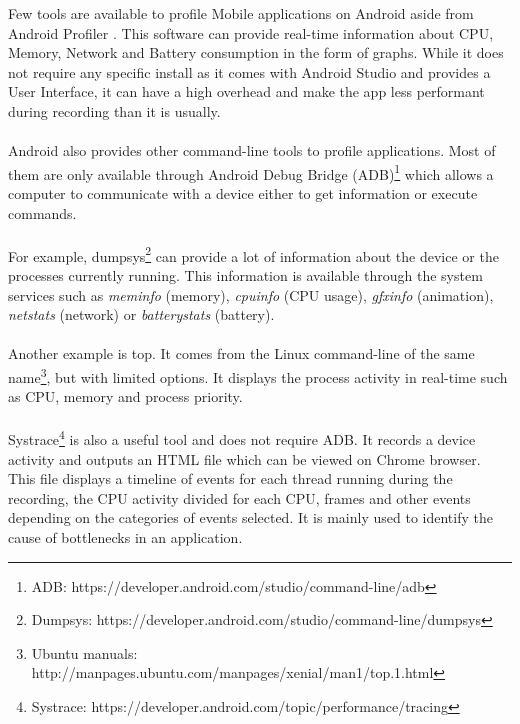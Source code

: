 \documentclass{kththesis}
\begin{document}
Few tools are available to profile Mobile applications on Android aside from Android Profiler \cite{nanoscope}. This software can provide real-time information about CPU, Memory, Network and Battery consumption in the form of graphs. While it does not require any specific install as it comes with Android Studio and provides a User Interface, it can have a high overhead \cite{nanoscope} and make the app less performant during recording than it is usually. 

\paragraph{}
Android also provides other command-line tools to profile applications. Most of them are only available through Android Debug Bridge (ADB)\footnote{ADB: https://developer.android.com/studio/command-line/adb} which allows a computer to communicate with a device either to get information or execute commands. 

\paragraph{}
For example, dumpsys\footnote{Dumpsys: https://developer.android.com/studio/command-line/dumpsys} can provide a lot of information about the device or the processes currently running. This information is available through the system services such as \textit{meminfo} (memory), \textit{cpuinfo} (CPU usage), \textit{gfxinfo} (animation), \textit{netstats} (network) or \textit{batterystats} (battery).

\paragraph{}
Another example is top. It comes from the Linux command-line of the same name\footnote{Ubuntu manuals: http://manpages.ubuntu.com/manpages/xenial/man1/top.1.html}, but with limited options. It displays the process activity in real-time such as CPU, memory and process priority.

\paragraph{}
Systrace\footnote{Systrace: https://developer.android.com/topic/performance/tracing} is also a useful tool and does not require ADB. It records a device activity and outputs an HTML file which can be viewed on Chrome browser. This file displays a timeline of events for each thread running during the recording, the CPU activity divided for each CPU, frames and other events depending on the categories of events selected. It is mainly used to identify the cause of bottlenecks in an application.
\end{document}
